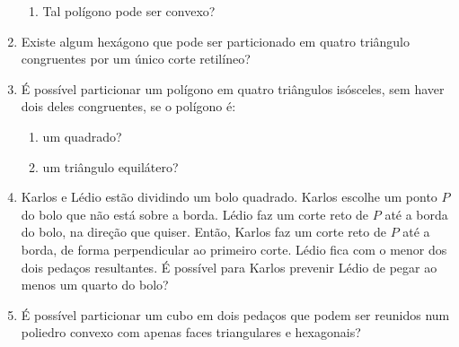 \documentclass{article}
\begin{document}
\begin{enumerate}
\begin{enumerate}
    \item Tal polígono pode ser convexo?
    \end{enumerate}
    
    \item Existe algum hexágono que pode ser particionado
    em quatro triângulo congruentes por um único corte retilíneo?
    
    \item É possível particionar um polígono
    em quatro triângulos isósceles,
    sem haver dois deles congruentes,
    se o polígono é:
    
    \begin{enumerate}
    \item um quadrado?
    
    \item um triângulo equilátero?
    \end{enumerate}
    
    \item Karlos e Lédio estão dividindo um bolo quadrado.
    Karlos escolhe um ponto $P$ do bolo
    que não está sobre a borda.
    Lédio faz um corte reto de $P$ até a borda do bolo,
    na direção que quiser.
    Então, Karlos faz um corte reto de $P$ até a borda,
    de forma perpendicular ao primeiro corte.
    Lédio fica com o menor dos dois pedaços resultantes.
    É possível para Karlos prevenir Lédio de pegar ao menos um quarto do bolo?
    
    \item É possível particionar um cubo em dois pedaços
    que podem ser reunidos num poliedro convexo
    com apenas faces triangulares e hexagonais?
\end{enumerate}
\end{document}
